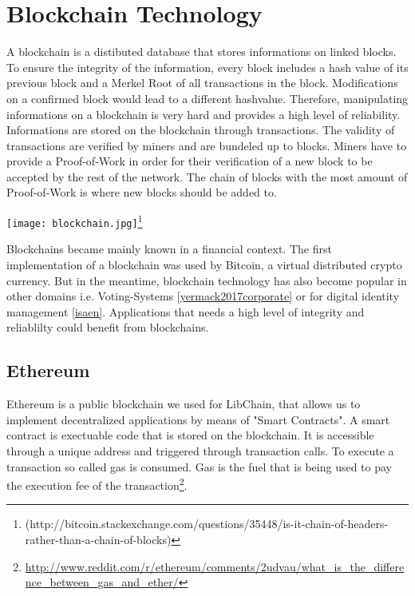 \chapter{Blockchain Technology\label{cha:chapter1}}

A blockchain is a distibuted database that stores informations on linked blocks. To ensure the integrity of the information, every block includes a hash value of its previous block and a Merkel Root of all transactions in the block. Modifications on a confirmed block would lead to a different hashvalue. Therefore, manipulating informations on a blockchain is very hard and provides a high level of reliability.
Informations are stored on the blockchain through transactions. The validity of transactions are verified by miners and are bundeled up to blocks. Miners have to provide a Proof-of-Work in order for their verification of a new block to be accepted by the rest of the network. The chain of blocks with the most amount of Proof-of-Work is where new blocks should be added to. 

\vspace{0.3cm}
\texttt{[image: blockchain.jpg]}\footnote{(http://bitcoin.stackexchange.com/questions/35448/is-it-chain-of-headers-rather-than-a-chain-of-blocks)}

Blockchains became mainly known in a financial context. The first implementation of a blockchain was used by Bitcoin, a virtual distributed crypto currency.
But in the meantime, blockchain technology has also become popular in other domains i.e. Voting-Systems \ref{yermack2017corporate} or for digital identity management \ref{isaen}. Applications that needs a high level of integrity and reliablilty could benefit from blockchains.




\section{Ethereum}
Ethereum is a public blockchain we used for LibChain, that allows us to implement decentralized applications by means of "Smart Contracts". A smart contract is exectuable code that is stored on the blockchain. It is accessible through a unique address and triggered through transaction calls.
To execute a transaction so called gas is consumed. Gas is the fuel that is being used to pay the execution fee of the transaction\footnote{\url{http://www.reddit.com/r/ethereum/comments/2udvau/what_is_the_difference_between_gas_and_ether/}}.

